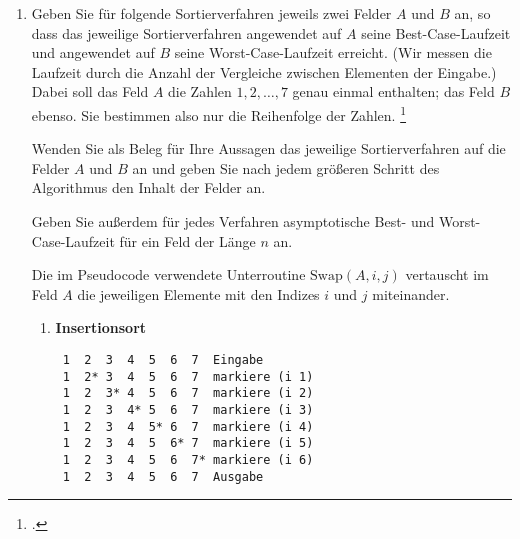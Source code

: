 \documentclass{bschlangaul-aufgabe}
\begin{document}

\begin{enumerate}


\item Geben Sie für folgende Sortierverfahren jeweils zwei Felder $A$
und $B$ an, so dass das jeweilige Sortierverfahren angewendet auf $A$
seine Best-Case-Laufzeit und angewendet auf $B$ seine
Worst-Case-Laufzeit erreicht. (Wir messen die Laufzeit durch die Anzahl
der Vergleiche zwischen Elementen der Eingabe.) Dabei soll das Feld $A$
die Zahlen $1,2,\dots,7$ genau einmal enthalten; das Feld $B$ ebenso.
Sie bestimmen also nur die Reihenfolge der Zahlen.
\footcite{examen:66115:2021:03}

Wenden Sie als Beleg für Ihre Aussagen das jeweilige Sortierverfahren
auf die Felder $A$ und $B$ an und geben Sie nach jedem größeren Schritt
des Algorithmus den Inhalt der Felder an.

Geben Sie außerdem für jedes Verfahren asymptotische Best- und
Worst-Case-Laufzeit für ein Feld der Länge $n$ an.

Die im Pseudocode verwendete Unterroutine $\text{Swap} (A,i,j)$
vertauscht im Feld $A$ die jeweiligen Elemente mit den Indizes $i$ und
$j$ miteinander.
\begin{enumerate}


\item \textbf{Insertionsort}

\begin{bAntwort}


\begin{verbatim}
 1  2  3  4  5  6  7  Eingabe
 1  2* 3  4  5  6  7  markiere (i 1)
 1  2  3* 4  5  6  7  markiere (i 2)
 1  2  3  4* 5  6  7  markiere (i 3)
 1  2  3  4  5* 6  7  markiere (i 4)
 1  2  3  4  5  6* 7  markiere (i 5)
 1  2  3  4  5  6  7* markiere (i 6)
 1  2  3  4  5  6  7  Ausgabe
\end{verbatim}


\end{bAntwort}
\end{enumerate}
\end{enumerate}
\end{document}
